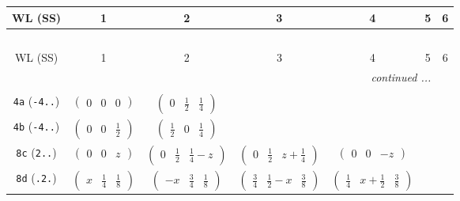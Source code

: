 \documentclass[fleqn,9pt,landscape]{jsarticle}
\begin{document}
\begin{center}
\renewcommand{\arraystretch}{1.2}
\begin{longtable}{ccccccc}
 \hline \hline
WL (SS) & 1 & 2 & 3 & 4 & 5 & 6 \\ \hline \endfirsthead

\multicolumn{6}{l}{\tablename\ \thetable{}} \\
 \hline \hline
WL (SS) & 1 & 2 & 3 & 4 & 5 & 6 \\ \hline \endhead

 \hline \hline
\multicolumn{6}{r}{\footnotesize\it continued ...} \\ \endfoot

 \hline \hline
\multicolumn{6}{r}{} \\ \endlastfoot

{\tt 4a} ({\tt -4..}) & $ \begin{pmatrix} 0 & 0 & 0 \end{pmatrix} $ & $ \begin{pmatrix} 0 & \frac{1}{2} & \frac{1}{4} \end{pmatrix} $ & $  $ & $  $ & $  $ & $  $ \\ \hline
{\tt 4b} ({\tt -4..}) & $ \begin{pmatrix} 0 & 0 & \frac{1}{2} \end{pmatrix} $ & $ \begin{pmatrix} \frac{1}{2} & 0 & \frac{1}{4} \end{pmatrix} $ & $  $ & $  $ & $  $ & $  $ \\ \hline
{\tt 8c} ({\tt 2..}) & $ \begin{pmatrix} 0 & 0 & z \end{pmatrix} $ & $ \begin{pmatrix} 0 & \frac{1}{2} & \frac{1}{4} - z \end{pmatrix} $ & $ \begin{pmatrix} 0 & \frac{1}{2} & z + \frac{1}{4} \end{pmatrix} $ & $ \begin{pmatrix} 0 & 0 & - z \end{pmatrix} $ & $  $ & $  $ \\ \hline
{\tt 8d} ({\tt .2.}) & $ \begin{pmatrix} x & \frac{1}{4} & \frac{1}{8} \end{pmatrix} $ & $ \begin{pmatrix} - x & \frac{3}{4} & \frac{1}{8} \end{pmatrix} $ & $ \begin{pmatrix} \frac{3}{4} & \frac{1}{2} - x & \frac{3}{8} \end{pmatrix} $ & $ \begin{pmatrix} \frac{1}{4} & x + \frac{1}{2} & \frac{3}{8} \end{pmatrix} $ & $  $ & $  $ \\ \hline

\end{longtable}
\end{center}
\end{document}
